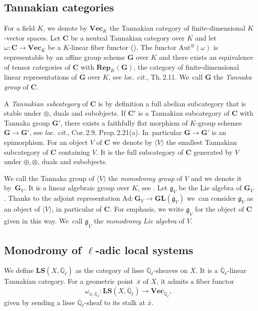 \documentclass[11pt]{article}
\providecommand{\loccit}{\emph{loc. cit.}}
\numberwithin{equation}{subsection}
\theoremstyle{definition}
\newcommand{\Qlbar}{\overline{\mathbb{Q}}_{\ell}}
\newcommand{\Q}{\mathbb Q}
\begin{document}
\subsection{Tannakian categories}
For a field $K$, we denote by $\mathbf{Vec}_K$ the Tannakian category of finite-dimensional $K$-vector spaces. Let $\mathbf{C}$ be a neutral Tannakian category over $K$ and let $\omega\colon\mathbf{C}\to\mathbf{Vec}_K$ be a $K$-linear fiber functor (\cite[Def.\,2.19]{Deligne-Milne-Tannakian-Categories}). The functor $\mathrm{Aut}^\otimes(\omega)$ is representable by an affine group scheme $\mathbf{G}$ over $K$ and there exists an equivalence of tensor categories of $\mathbf{C}$ with $\mathbf{Rep}_K(\mathbf{G})$, the category of finite-dimensional linear representations of $\mathbf{G}$ over $K$, see \loccit, Th.\,2.11. We~call $\mathbf{G}$ the \emph{Tannaka group} of $\mathbf{C}$.

A \emph{Tannakian subcategory} of $\mathbf{C}$ is by definition a full abelian subcategory that is stable under $\otimes$, duals and subobjects. If $\mathbf{C}'$ is a Tannakian subcategory of $\mathbf{C}$ with Tannaka group $\mathbf{G}'$, there exists a faithfully flat morphism of $K$-group schemes $\mathbf{G}\to\mathbf{G}'$, see \loccit, Cor.\,2.9, Prop.\,2.21(a). In~particular $\mathbf{G}\to\mathbf{G}'$ is an epimorphism. For an object $V$ of $\mathbf{C}$ we denote by $\langle V\rangle$ the smallest Tannakian subcategory of $\mathbf{C}$ containing $V$. It is the full subcategory of $\mathbf{C}$ generated by $V$ under $\oplus, \otimes$, duals and subobjects.

We call the Tannaka group of $\langle V\rangle$ the \emph{monodromy group} of $V$ and we denote it by~$\mathbf{G}_V$. It is a linear algebraic group over $K$, see \cite[Prop.\,2.20(b)]{Deligne-Milne-Tannakian-Categories}. Let $\mathfrak{g}_V$ be the Lie algebra of $\mathbf{G}_V$. Thanks to the adjoint representation $\mathrm{Ad}\colon\mathbf{G}_V\to\mathbf{GL}(\mathfrak{g}_V)$ we~can consider $\mathfrak{g}_V$ as an object of $\langle V\rangle$, in particular of $\mathbf{C}$. For emphasis, we write $\underline{\mathfrak{g}}_V$ for the object of $\mathbf{C}$ given in this way. We~call $\underline{\mathfrak{g}}_V$ the \emph{monodromy Lie algebra} of $V$.

\subsection{Monodromy of \texorpdfstring{$\ell$}{l}-adic local systems}
We define $\mathbf{LS}(X,\overline{\Q}_\ell)$ as the category of lisse $\overline{\Q}_\ell$-sheaves on $X$. It is a $\Qlbar$-linear Tannakian category. For a geometric point~$\bar x$ of $X$, it admits a fiber functor
\[
\omega_{\bar x,\overline{\Q}_\ell}\colon\mathbf{LS}(X,\overline{\Q}_\ell)\to\mathbf{Vec}_{\overline{\Q}_\ell},
\]
given by sending a lisse $\Qlbar$-sheaf to its stalk at $\bar x$.
\end{document}
